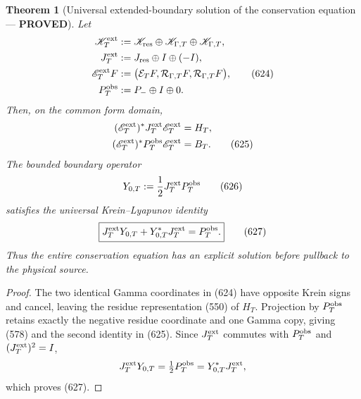 \documentclass[11pt]{article}
\newtheorem{theorem}{Theorem}
\newcommand{\PROVED}{\textcolor{green!45!black}{\textbf{PROVED}}}
\begin{document}
\begin{theorem}[Universal extended-boundary solution of the conservation
equation --- \PROVED]
Let
\begin{align}
 \mathscr K_T^{\rm ext}
 &:=\mathscr K_{\rm res}\oplus
     \mathscr K_{\Gamma,T}\oplus\mathscr K_{\Gamma,T},\notag\\
 J_T^{\rm ext}
 &:=J_{\rm res}\oplus I\oplus(-I),\notag\\
 \mathscr E_T^{\rm ext}F
 &:=\bigl(\mathcal E_TF,\mathcal R_{\Gamma,T}F,
                    \mathcal R_{\Gamma,T}F\bigr),     \tag{624}\\
 P_T^{\rm obs}&:=P_-\oplus I\oplus0 .
\end{align}
Then, on the common form domain,
\begin{align}
 (\mathscr E_T^{\rm ext})^*J_T^{\rm ext}
       \mathscr E_T^{\rm ext}&=H_T,\notag\\
 (\mathscr E_T^{\rm ext})^*P_T^{\rm obs}
       \mathscr E_T^{\rm ext}&=B_T.                  \tag{625}
\end{align}
The bounded boundary operator
\begin{equation}
 Y_{0,T}:=\frac12J_T^{\rm ext}P_T^{\rm obs}          \tag{626}
\end{equation}
satisfies the universal Krein--Lyapunov identity
\begin{equation}
 \boxed{
 J_T^{\rm ext}Y_{0,T}
 +Y_{0,T}^*J_T^{\rm ext}=P_T^{\rm obs}.}             \tag{627}
\end{equation}
Thus the entire conservation equation has an explicit solution before
pullback to the physical source.
\end{theorem}

\begin{proof}
The two identical Gamma coordinates in (624) have opposite Krein signs and
cancel, leaving the residue representation (550) of \(H_T\).  Projection
by \(P_T^{\rm obs}\) retains exactly the negative residue coordinate and
one Gamma copy, giving (578) and the second identity in (625).
Since \(J_T^{\rm ext}\) commutes with \(P_T^{\rm obs}\) and
\((J_T^{\rm ext})^2=I\),
\[
 J_T^{\rm ext}Y_{0,T}
 =\tfrac12P_T^{\rm obs}
 =Y_{0,T}^*J_T^{\rm ext},
\]
which proves (627).
\end{proof}
\end{document}
